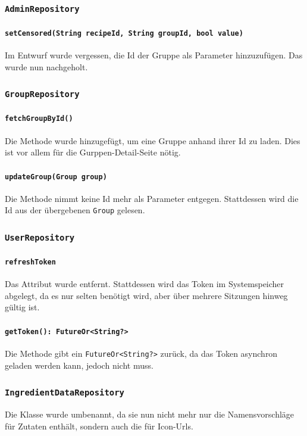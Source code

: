 \documentclass{implementierungsheft}
\begin{document}
\subsubsection{\texttt{AdminRepository}}
\paragraph{\texttt{setCensored(String recipeId, String groupId, bool value)}} Im Entwurf wurde vergessen, die Id der Gruppe als Parameter hinzuzufügen. Das wurde nun nachgeholt.
\subsubsection{\texttt{GroupRepository}}
\paragraph*{\texttt{fetchGroupById()}} Die Methode wurde hinzugefügt, um eine Gruppe anhand ihrer Id zu laden. Dies ist vor allem für die Gurppen-Detail-Seite nötig.
\paragraph*{\texttt{updateGroup(Group group)}} Die Methode nimmt keine Id mehr als Parameter entgegen. Stattdessen wird die Id aus der übergebenen \texttt{Group} gelesen.
\subsubsection{\texttt{UserRepository}}
\paragraph{\texttt{refreshToken}}
Das Attribut wurde entfernt. Stattdessen wird das Token im Systemspeicher abgelegt, da es nur selten benötigt wird, aber über mehrere Sitzungen hinweg gültig ist.
\paragraph{\texttt{getToken(): FutureOr<String?>}} Die Methode gibt ein \texttt{FutureOr<String?>} zurück, da das Token asynchron geladen werden kann, jedoch nicht muss.
\subsubsection{\texttt{IngredientDataRepository}}
Die Klasse wurde umbenannt, da sie nun nicht mehr nur die Namensvorschläge für Zutaten enthält, sondern auch die für Icon-Urls.
\end{document}
